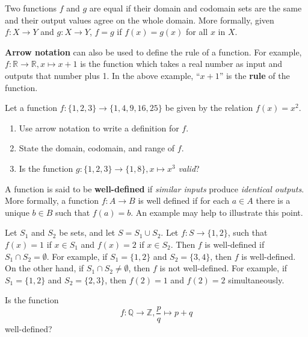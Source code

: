 Two functions $f$ and $g$ are equal if their domain and codomain sets are the same and their output values agree on the whole domain. More formally, given $f: X \to Y$ and $g: X \to Y$, $f = g$ if $f(x) = g(x)$ for all $x$ in $X$.

\textbf{Arrow notation} can also be used to define the rule of a function. For example, $f: \mathbb{R} \to \mathbb{R}, x \mapsto x+1$ is the function which takes a real number as input and outputs that number plus 1. In the above example, ``$x + 1$'' is the \textbf{rule} of the function.

\begin{exercise}
    Let a function $f: \{1, 2, 3\} \to \{1, 4, 9, 16, 25\}$ be given by the relation $f(x) = x^2$.
    \begin{enumerate}[label=(\roman*)]
        \item Use arrow notation to write a definition for $f$.
        \item State the domain, codomain, and range of $f$.
        \item Is the function $g: \{1, 2, 3\} \to \{1, 8\}, x \mapsto x^3$ \textit{valid}?
    \end{enumerate}
\end{exercise}

\newpage

A function is said to be \textbf{well-defined} if \textit{similar inputs} produce \textit{identical outputs}. More formally, a function $f: A \to B$ is well defined if for each $a \in A$ there is a unique $b \in B$ such that $f(a) = b$. An example may help to illustrate this point.
\begin{example}
    Let $S_1$ and $S_2$ be sets, and let $S = S_1 \cup S_2$. Let $f: S \to \{1, 2\}$, such that $f(x) = 1$ if $x \in S_1$ and $f(x) = 2$ if $x \in S_2$. Then $f$ is well-defined if $S_1 \cap S_2 = \emptyset$. For example, if $S_1 = \{1, 2\}$ and $S_2 = \{3, 4\}$, then $f$ is well-defined. On the other hand, if $S_1 \cap S_2 \neq \emptyset$, then $f$ is not well-defined. For example, if $S_1 = \{1, 2\}$ and $S_2 = \{2, 3\}$, then $f(2) = 1$ and $f(2) = 2$ simultaneously.
\end{example}
\begin{exercise}
    Is the function
    \[
        f: \mathbb{Q} \to \mathbb{Z}, \frac pq \mapsto p + q    
    \]
    well-defined?
\end{exercise}

